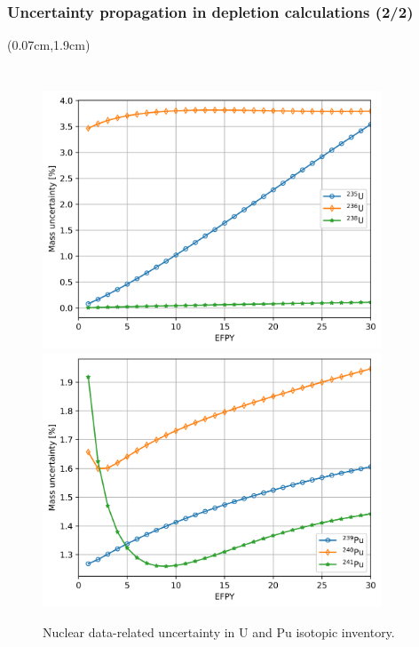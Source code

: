 \begin{frame}
\frametitle{Uncertainty propagation in depletion calculations (2/2)}
\begin{textblock*}{12.4cm}(0.07cm,1.9cm) %
	\begin{columns}
		\column[t]{5.5cm}
		\vspace{-4mm}
		{\begin{figure}[hbp!] %
				\includegraphics[width=0.9\textwidth]{../dissertation/figures/uq/scale_mass_std_u.png}\\
				\vspace{-4.5mm}
				\hspace{+0.1mm}
				\includegraphics[width=0.9\textwidth]{../dissertation/figures/uq/scale_mass_std_pu.png}
				\vspace{-3.5mm}
				\caption{Nuclear data-related uncertainty \newline in U and Pu 
				isotopic 
				inventory.}
		\end{figure}}
		

\end{columns}
\end{textblock*}
\end{frame}
